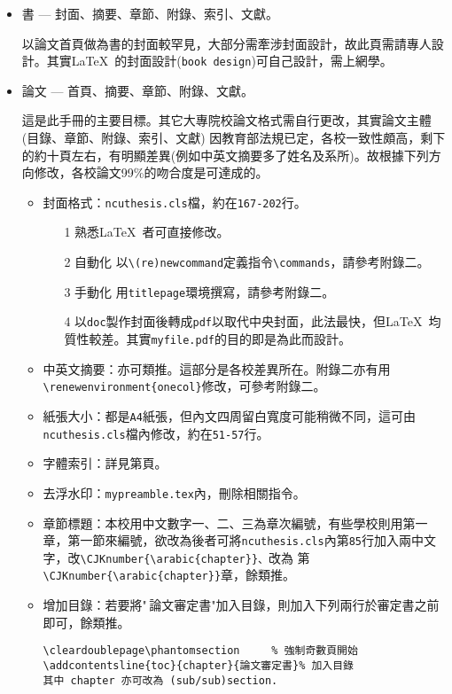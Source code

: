\begin{itemize}
\item 書 --- 封面、摘要、章節、附錄、索引、文獻。

以論文首頁做為書的封面較罕見，大部分需牽涉封面設計，故此頁需請專人設計。其實\LaTeX\ 的封面設計({\tt book design})可自己設計，需上網學。

\item 論文 --- 首頁、摘要、章節、附錄、文獻。

這是此手冊的主要目標。其它大專院校論文格式需自行更改，其實論文主體(目錄、章節、附錄、索引、文獻) 因教育部法規已定，各校一致性頗高，剩下的約十頁左右，有明顯差異(例如中英文摘要多了姓名及系所)。故根據下列方向修改，各校論文99\%的吻合度是可達成的。
\begin{itemize}
\item 封面格式：{\tt ncuthesis.cls}檔，約在{\tt 167-202}行。
\begin{itemize}
\item [1] 熟悉\LaTeX\ 者可直接修改。
\item [2]  自動化  以{\tt \textbackslash (re)newcommand}定義指令{\tt \textbackslash commands}，請參考附錄二。

\item [3] 手動化 用{\tt titlepage}環境撰寫，請參考附錄二。

\item [4] 以{\tt doc}製作封面後轉成{\tt pdf}以取代中央封面，此法最快，但\LaTeX\ 均質性較差。其實{\tt myfile.pdf}的目的即是為此而設計。
\end{itemize}
\item 中英文摘要：亦可類推。這部分是各校差異所在。附錄二亦有用\verb|\renewenvironment{onecol}|修改，可參考附錄二。

\item 紙張大小：都是{\tt A4}紙張，但內文四周留白寬度可能稍微不同，這可由{\tt ncuthesis.cls}檔內修改，約在{\tt 51-57}行。
\item 字體索引：詳見第\fbox{\pageref{indpage}}頁。
\item 去浮水印：{\tt mypreamble.tex}內，刪除相關指令。
\item 章節標題：本校用中文數字一、二、三為章次編號，有些學校則用第一章，第一節來編號，欲改為後者可將{\tt ncuthesis.cls}內第{\tt 85}行加入兩中文字，改\verb|\CJKnumber{\arabic{chapter}}、|改為
{\color{red}第}\verb|\CJKnumber{\arabic{chapter}}|{\color{red}章}，餘類推。
\item 增加目錄：若要將"\,論文審定書"加入目錄，則加入下列兩行於審定書之前即可，餘類推。
\begin{verbatim}
\cleardoublepage\phantomsection     % 強制奇數頁開始
\addcontentsline{toc}{chapter}{論文審定書}% 加入目錄
其中 chapter 亦可改為 (sub/sub)section.
\end{verbatim}
\end{itemize}


\end{itemize}
